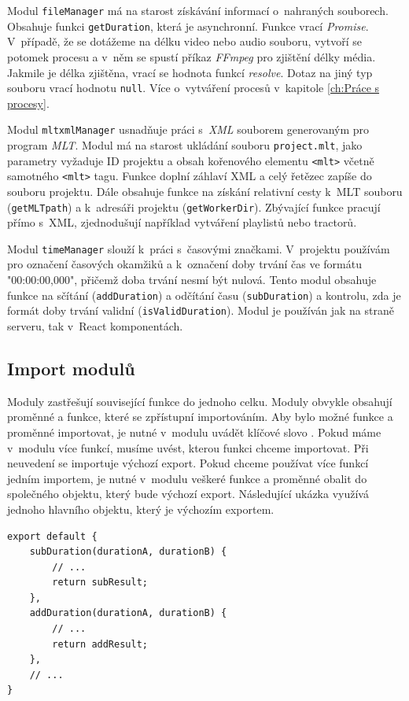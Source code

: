 Modul \texttt{fileManager} má na starost získávání informací o~nahraných souborech. Obsahuje funkci \texttt{getDuration}, která je asynchronní. Funkce vrací \textit{Promise}. V~případě, že se dotážeme na délku video nebo audio souboru, vytvoří se potomek procesu a v~něm se spustí příkaz \textit{FFmpeg} pro zjištění délky média. Jakmile je délka zjištěna, vrací se hodnota funkcí \textit{resolve}. Dotaz na jiný typ souboru vrací hodnotu \texttt{null}. Více o~vytváření procesů v~kapitole \ref{ch:Práce s procesy}.

Modul \texttt{mltxmlManager} usnadňuje práci s~\textit{XML} souborem generovaným pro program \textit{MLT}. Modul má na starost ukládání souboru \texttt{project.mlt}, jako parametry vyžaduje ID projektu a obsah kořenového elementu \texttt{<mlt>} včetně samotného \texttt{<mlt>} tagu. Funkce doplní záhlaví XML a celý řetězec zapíše do souboru projektu. Dále obsahuje funkce na získání relativní cesty k~MLT souboru (\texttt{getMLTpath}) a k~adresáři projektu (\texttt{getWorkerDir}). Zbývající funkce pracují přímo s~XML, zjednodušují například vytváření playlistů nebo tractorů.

Modul \texttt{timeManager} slouží k~práci s~časovými značkami. V~projektu používám pro označení časových okamžiků a k~označení doby trvání čas ve formátu "00:00:00,000", přičemž doba trvání nesmí být nulová. Tento modul obsahuje funkce na sčítání (\texttt{addDuration}) a odčítání času (\texttt{subDuration}) a kontrolu, zda je formát doby trvání validní (\texttt{isValidDuration}). Modul je používán jak na straně serveru, tak v~React komponentách.

\subsection{Import modulů}
Moduly zastřešují související funkce do jednoho celku. Moduly obvykle obsahují proměnné a funkce, které se zpřístupní importováním. Aby bylo možné funkce a proměnné importovat, je nutné v~modulu uvádět klíčové slovo . Pokud máme v~modulu více funkcí, musíme uvést, kterou funkci chceme importovat. Při neuvedení se importuje výchozí export. Pokud chceme používat více funkcí jedním importem, je nutné v~modulu veškeré funkce a proměnné obalit do společného objektu, který bude výchozí export. Následující ukázka využívá jednoho hlavního objektu, který je výchozím exportem.
\begin{lstlisting}[style=JavaScript]
export default {
    subDuration(durationA, durationB) {
        // ...
        return subResult;
    },
    addDuration(durationA, durationB) {
        // ...
        return addResult;
    },
    // ...
}
\end{lstlisting}

